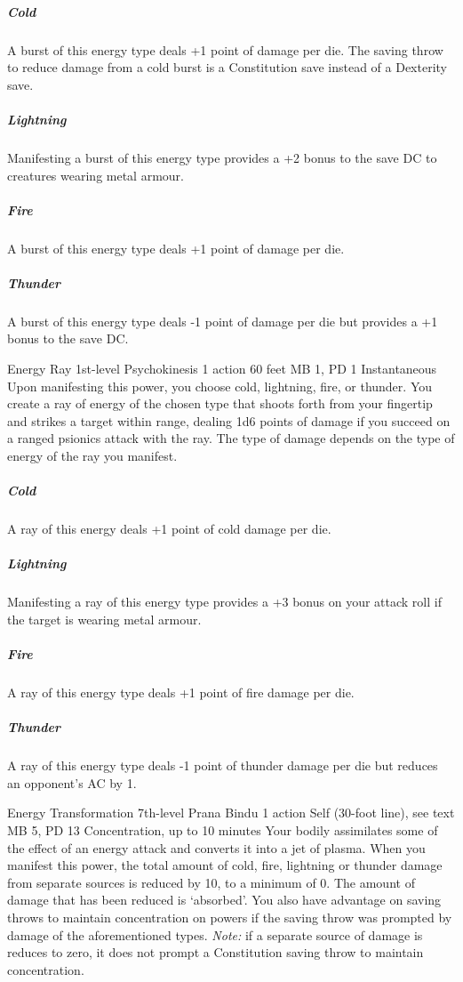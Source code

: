   \subparagraph{Cold}
  A burst of this energy type deals +1 point of damage per die.
  The saving throw to reduce damage from a cold burst
  is a Constitution save instead of a Dexterity save.
  
  \subparagraph{Lightning}
  Manifesting a burst of this energy type provides a +2 bonus
  to the save DC to creatures wearing metal armour.
  
  \subparagraph{Fire}
  A burst of this energy type deals +1 point of damage per die.
  
  \subparagraph{Thunder}
    A burst of this energy type deals -1 point of damage per die
    but provides a +1 bonus to the save DC.

\DndPowerHeader%
  {Energy Ray}
  {1st-level Psychokinesis}
  {1 action}
  {60 feet}
  {MB 1, PD 1}
  {Instantaneous}
Upon manifesting this power,
you choose cold, lightning, fire, or thunder.
You create a ray of energy of the chosen type that
shoots forth from your fingertip and strikes a target within range,
dealing 1d6 points of damage if you succeed on a
ranged psionics attack with the ray.
The type of damage depends on
the type of energy of the ray you manifest. 
  \subparagraph{Cold}
    A ray of this energy deals +1 point of cold damage per die.
  \subparagraph{Lightning}
    Manifesting a ray of this energy type provides a
    +3 bonus on your attack roll if the target is wearing metal armour.
  \subparagraph{Fire}
    A ray of this energy type deals +1 point of fire damage per die.
  \subparagraph{Thunder}
    A ray of this energy type deals -1 point of thunder damage per die
    but reduces an opponent's AC by 1.

\DndPowerHeader%
  {Energy Transformation}
  {7th-level Prana Bindu}
  {1 action}
  {Self (30-foot line), see text}
  {MB 5, PD 13}
  {Concentration, up to 10 minutes}
  Your bodily assimilates some of the effect of an
  energy attack and converts it into a jet of plasma.
  When you manifest this power,
  the total amount of cold, fire,
  lightning or thunder damage
  from separate sources is reduced by 10,
  to a minimum of 0.
  The amount of damage that has been reduced
  is `absorbed'.
  You also have advantage on saving throws to
  maintain concentration on powers if the
  saving throw was prompted by damage of the
  aforementioned types.
  \emph{Note:} if a separate source of damage is
  reduces to zero, it does not prompt a Constitution
  saving throw to maintain concentration.
  
